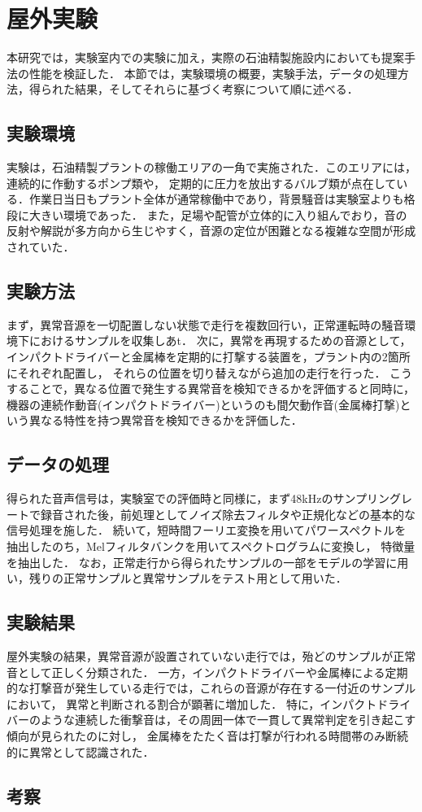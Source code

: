 \documentclass[../main]{subfiles}
\begin{document}
\section{屋外実験}
\label{sec:vexp_cone-index}
本研究では，実験室内での実験に加え，実際の石油精製施設内においても提案手法の性能を検証した．
本節では，実験環境の概要，実験手法，データの処理方法，得られた結果，そしてそれらに基づく考察について順に述べる．
\subsection{実験環境}
\label{subsec:vexp_ci_environment}
実験は，石油精製プラントの稼働エリアの一角で実施された．このエリアには，連続的に作動するポンプ類や，
定期的に圧力を放出するバルブ類が点在している．作業日当日もプラント全体が通常稼働中であり，背景騒音は実験室よりも格段に大きい環境であった．
また，足場や配管が立体的に入り組んでおり，音の反射や解説が多方向から生じやすく，音源の定位が困難となる複雑な空間が形成されていた．
\subsection{実験方法}
\label{subsec:vexp_ci_method}

まず，異常音源を一切配置しない状態で走行を複数回行い，正常運転時の騒音環境下におけるサンプルを収集しあt．
次に，異常を再現するための音源として，インパクトドライバーと金属棒を定期的に打撃する装置を，プラント内の2箇所にそれぞれ配置し，
それらの位置を切り替えながら追加の走行を行った．
こうすることで，異なる位置で発生する異常音を検知できるかを評価すると同時に，
機器の連続作動音(インパクトドライバー)というのも間欠動作音(金属棒打撃)という異なる特性を持つ異常音を検知できるかを評価した．
\subsection{データの処理}
\label{subsec:vexp_ci_processing}
得られた音声信号は，実験室での評価時と同様に，まず48kHzのサンプリングレートで録音された後，前処理としてノイズ除去フィルタや正規化などの基本的な信号処理を施した．
続いて，短時間フーリエ変換を用いてパワースペクトルを抽出したのち，Melフィルタバンクを用いてスペクトログラムに変換し，
特徴量を抽出した．
なお，正常走行から得られたサンプルの一部をモデルの学習に用い，残りの正常サンプルと異常サンプルをテスト用として用いた．

\subsection{実験結果}
\label{subsec:vexp_ci_result}
屋外実験の結果，異常音源が設置されていない走行では，殆どのサンプルが正常音として正しく分類された．
一方，インパクトドライバーや金属棒による定期的な打撃音が発生している走行では，これらの音源が存在する一付近のサンプルにおいて，
異常と判断される割合が顕著に増加した．
特に，インパクトドライバーのような連続した衝撃音は，その周囲一体で一貫して異常判定を引き起こす傾向が見られたのに対し，
金属棒をたたく音は打撃が行われる時間帯のみ断続的に異常として認識された．
\subsection{考察}
\end{document}
